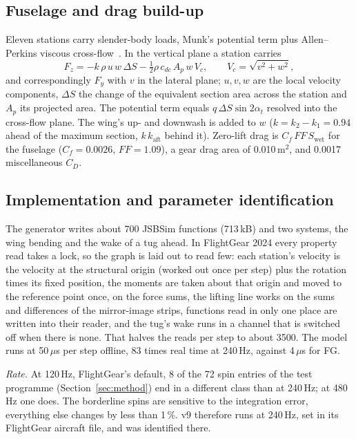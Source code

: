 \documentclass[10pt,a4paper,twocolumn]{article}
\newcommand{\vnine}{v9}
\newcommand{\FG}{FG}
\begin{document}
\subsection{Fuselage and drag build-up}
Eleven stations carry slender-body loads, Munk's potential term plus Allen--Perkins viscous cross-flow~\cite{allen}. In the
vertical plane a station carries
\begin{equation}
F_z = -k\,\rho\,u\,w\,\Delta S-\tfrac12\rho\,c_{dc}\,A_p\,w\,V_c,\qquad V_c=\sqrt{v^2+w^2},
\end{equation}
and correspondingly $F_y$ with $v$ in the lateral plane; $u,v,w$ are the local velocity components, $\Delta S$ the change of the
equivalent section area across the station and $A_p$ its projected area. The potential term equals $q\,\Delta S\sin2\alpha_t$
resolved into the cross-flow plane. The wing's up- and downwash is added to $w$ ($k=k_2-k_1=0.94$ ahead of the maximum section,
$k\,k_\text{aft}$ behind it). Zero-lift drag is $C_f\,\mathit{FF}\,S_\text{wet}$ for the fuselage
($C_f=0.0026$, $\mathit{FF}=1.09$), a gear drag area of 0.010\,m$^2$, and 0.0017 miscellaneous $C_D$.

\subsection{Implementation and parameter identification}
The generator writes about 700 JSBSim functions (713\,kB) and two systems, the wing bending and the wake of a tug ahead. In
FlightGear 2024 every property read takes a lock, so the graph is laid out to read few: each station's velocity is the velocity at
the structural origin (worked out once per step) plus the rotation times its fixed position, the moments are taken about that origin
and moved to the reference point once, on the force sums, the lifting line works on the sums and differences of the mirror-image
strips, functions read in only one place are written into their reader, and the tug's wake runs in a channel that is switched off
when there is none. That halves the reads per step to about 3500. The model runs at 50\,$\mu$s per step offline, 83 times real
time at 240\,Hz, against 4\,$\mu$s for \FG.

\emph{Rate.} At 120\,Hz, FlightGear's default, 8 of the 72 spin entries of the test programme (Section~\ref{sec:method}) end in a
different class than at 240\,Hz; at 480\,Hz one does. The borderline spins are sensitive to the integration error, everything else
changes by less than 1\,\%. \vnine{} therefore runs at 240\,Hz, set in its FlightGear aircraft file, and was identified there.
\end{document}
